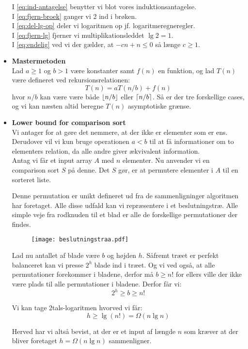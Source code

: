 \begin{itemize}
I \cref{eq:ind-antagelse} benytter vi blot vores induktionsantagelse.\\
I \cref{eq:fjern-broek} ganger vi 2 ind i brøken.\\
I \cref{eq:del-lg-op} deler vi logaritmen op jf. logaritmeregneregler.\\
I \cref{eq:fjern-lg} fjerner vi multiplikationsleddet $\lg 2 = 1$.\\
I \cref{eq:endelig} ved vi der gælder, at $-cn + n \leq 0$ så længe $c \geq 1$.\\



\item \textbf{Mastermetoden}\\
Lad $a \geq 1$ og $b > 1$ være konstanter samt $f(n)$ en funktion, og lad $T(n)$ være defineret ved rekursionsrelationen:
$$
	T(n) = aT(n/b) + f(n)
$$
hvor $n/b$ kan være være både $\left\lfloor n/b \right\rfloor$ eller $\left\lceil n/b \right\rceil$. Så er der tre forskellige cases, og vi kan næsten altid beregne $T(n)$ asymptotiske grænse.

\item \textbf{Lower bound for comparison sort}\\
Vi antager for at gøre det nemmere, at der ikke er elementer som er ens. Derudover vil vi kun bruge operationen $a < b$ til at få informationer om to elementers relation, da alle andre giver ækvivalent information.\\

Antag vi får et input array $A$ med $n$ elementer. Nu anvender vi en comparison sort $S$ på denne. Det $S$ gør, er at permutere elementer i $A$ til en sorteret liste.

Denne permutation er unikt defineret ud fra de sammenligninger algoritmen har foretaget. Alle disse udfald kan vi repræsentere i et beslutningstræ. Alle simple veje fra rodknuden til et blad er alle de forskellige permutationer der findes.\\

\begin{figure}[H]
	\begin{center}
		\texttt{[image: beslutningstraa.pdf]}
	\end{center}
	\label{fig:lower}
\end{figure}

Lad nu antallet af blade være $b$ og højden $h$. Såfremt træet er perfekt balanceret kan vi presse $2^h$ blade ind i træet. Og vi ved også, at alle permutationer forekommer i bladene, derfor må $b \geq n!$ for ellers ville der ikke være plads til alle permutationer i bladene. Derfor får vi:
$$
2^h \geq b \geq n!
$$

Vi kan tage 2tals-logaritmen hvorved vi får:
$$
h \geq \lg(n!) = \Omega(n \lg n)
$$

Herved har vi altså bevist, at der er et input af længde $n$ som kræver at der bliver foretaget $h = \Omega(n \lg n)$ sammenligner.



\end{itemize}
